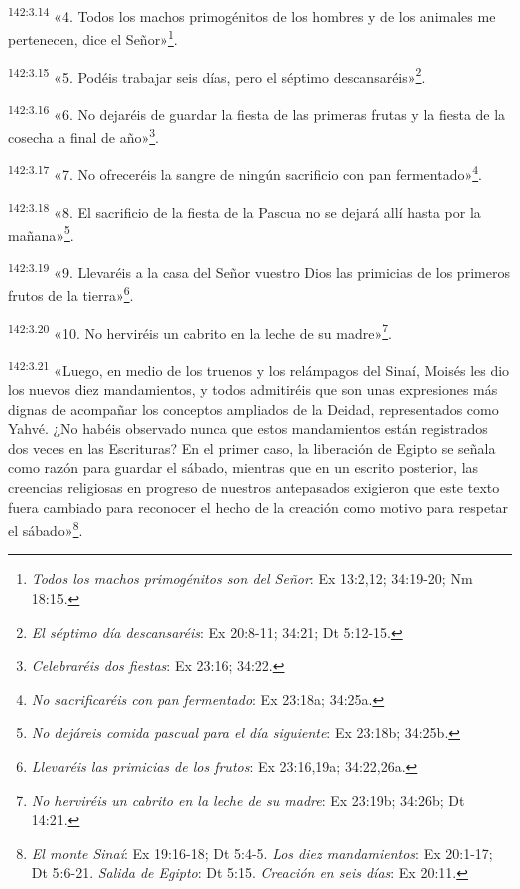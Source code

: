 \par
\textsuperscript{142:3.14} «4. Todos los machos primogénitos de los hombres y de los animales me pertenecen, dice el Señor»\footnote{\textit{Todos los machos primogénitos son del Señor}: Ex 13:2,12; 34:19-20; Nm 18:15.}.

\par
\textsuperscript{142:3.15} «5. Podéis trabajar seis días, pero el séptimo descansaréis»\footnote{\textit{El séptimo día descansaréis}: Ex 20:8-11; 34:21; Dt 5:12-15.}.

\par
\textsuperscript{142:3.16} «6. No dejaréis de guardar la fiesta de las primeras frutas y la fiesta de la cosecha a final de año»\footnote{\textit{Celebraréis dos fiestas}: Ex 23:16; 34:22.}.

\par
\textsuperscript{142:3.17} «7. No ofreceréis la sangre de ningún sacrificio con pan fermentado»\footnote{\textit{No sacrificaréis con pan fermentado}: Ex 23:18a; 34:25a.}.

\par
\textsuperscript{142:3.18} «8. El sacrificio de la fiesta de la Pascua no se dejará allí hasta por la mañana»\footnote{\textit{No dejáreis comida pascual para el día siguiente}: Ex 23:18b; 34:25b.}.

\par
\textsuperscript{142:3.19} «9. Llevaréis a la casa del Señor vuestro Dios las primicias de los primeros frutos de la tierra»\footnote{\textit{Llevaréis las primicias de los frutos}: Ex 23:16,19a; 34:22,26a.}.

\par
\textsuperscript{142:3.20} «10. No herviréis un cabrito en la leche de su madre»\footnote{\textit{No herviréis un cabrito en la leche de su madre}: Ex 23:19b; 34:26b; Dt 14:21.}.

\par
\textsuperscript{142:3.21} «Luego, en medio de los truenos y los relámpagos del Sinaí, Moisés les dio los nuevos diez mandamientos, y todos admitiréis que son unas expresiones más dignas de acompañar los conceptos ampliados de la Deidad, representados como Yahvé. ¿No habéis observado nunca que estos mandamientos están registrados dos veces en las Escrituras? En el primer caso, la liberación de Egipto se señala como razón para guardar el sábado, mientras que en un escrito posterior, las creencias religiosas en progreso de nuestros antepasados exigieron que este texto fuera cambiado para reconocer el hecho de la creación como motivo para respetar el sábado»\footnote{\textit{El monte Sinaí}: Ex 19:16-18; Dt 5:4-5. \textit{Los diez mandamientos}: Ex 20:1-17; Dt 5:6-21. \textit{Salida de Egipto}: Dt 5:15. \textit{Creación en seis días}: Ex 20:11.}.


